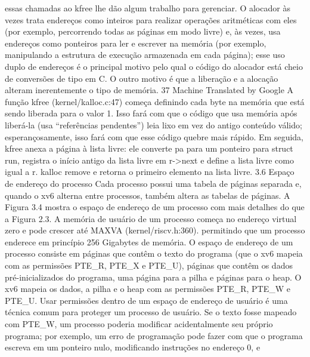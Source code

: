 essas  chamadas  ao  kfree  lhe  dão  algum  trabalho  para  gerenciar.
 O  alocador  às  vezes  trata  endereços  como  inteiros  para  realizar  operações  aritméticas  com  eles  (por  exemplo,  percorrendo  
todas  as  páginas  em  modo  livre)  e,  às  vezes,  usa  endereços  como  ponteiros  para  ler  e  escrever  na  memória  (por  exemplo,  
manipulando  a  estrutura  de  execução  armazenada  em  cada  página);  esse  uso  duplo  de  endereços  é  o  principal  motivo  pelo  qual  o  
código  do  alocador  está  cheio  de  conversões  de  tipo  em  C.  O  outro  motivo  é  que  a  liberação  e  a  alocação  alteram  inerentemente  o  
tipo  de  memória.
 37
Machine Translated by Google
 A  função  kfree  (kernel/kalloc.c:47)  começa  definindo  cada  byte  na  memória  que  está  sendo  liberada  para  o  valor  1.  Isso  fará  
com  que  o  código  que  usa  memória  após  liberá-la  (usa  “referências  pendentes”)  leia  lixo  em  vez  do  antigo  conteúdo  válido;  
esperançosamente,  isso  fará  com  que  esse  código  quebre  mais  rápido.
 Em  seguida,  kfree  anexa  a  página  à  lista  livre:  ele  converte  pa  para  um  ponteiro  para  struct  run,  registra  o  início  antigo  
da  lista  livre  em  r->next  e  define  a  lista  livre  como  igual  a  r.  kalloc  remove  e  retorna  o  primeiro  elemento  na  lista  livre.
 3.6  Espaço  de  endereço  do  processo
 Cada  processo  possui  uma  tabela  de  páginas  separada  e,  quando  o  xv6  alterna  entre  processos,  também  altera  as  
tabelas  de  páginas.  A  Figura  3.4  mostra  o  espaço  de  endereço  de  um  processo  com  mais  detalhes  do  que  a  Figura  2.3.  
A  memória  de  usuário  de  um  processo  começa  no  endereço  virtual  zero  e  pode  crescer  até  MAXVA  (kernel/riscv.h:360).  
permitindo  que  um  processo  enderece  em  princípio  256  Gigabytes  de  memória.
 O  espaço  de  endereço  de  um  processo  consiste  em  páginas  que  contêm  o  texto  do  programa  (que  o  xv6  mapeia  
com  as  permissões  PTE_R,  PTE_X  e  PTE_U),  páginas  que  contêm  os  dados  pré-inicializados  do  programa,  uma  página  
para  a  pilha  e  páginas  para  o  heap.  O  xv6  mapeia  os  dados,  a  pilha  e  o  heap  com  as  permissões  PTE_R,  PTE_W  e  
PTE_U.
 Usar  permissões  dentro  de  um  espaço  de  endereço  de  usuário  é  uma  técnica  comum  para  proteger  um  processo  de  usuário.
 Se  o  texto  fosse  mapeado  com  PTE_W,  um  processo  poderia  modificar  acidentalmente  seu  próprio  programa;  por  exemplo,  um  
erro  de  programação  pode  fazer  com  que  o  programa  escreva  em  um  ponteiro  nulo,  modificando  instruções  no  endereço  0,  e  
